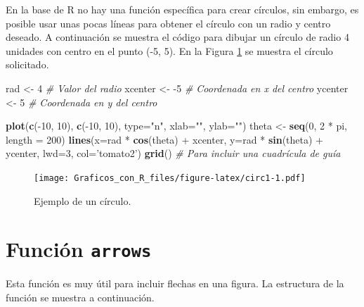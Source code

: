 \documentclass[10pt,]{krantz}
\makeatletter
\newenvironment{Shaded}{\begin{snugshade}}{\end{snugshade}}
\newcommand{\KeywordTok}[1]{\textcolor[rgb]{0.13,0.29,0.53}{\textbf{{#1}}}}
\newcommand{\DataTypeTok}[1]{\textcolor[rgb]{0.13,0.29,0.53}{{#1}}}
\newcommand{\DecValTok}[1]{\textcolor[rgb]{0.00,0.00,0.81}{{#1}}}
\newcommand{\StringTok}[1]{\textcolor[rgb]{0.31,0.60,0.02}{{#1}}}
\newcommand{\CommentTok}[1]{\textcolor[rgb]{0.56,0.35,0.01}{\textit{{#1}}}}
\newcommand{\NormalTok}[1]{{#1}}
\let\proglang=\textsf
\newenvironment{kframe}{%
\medskip{}
\setlength{\fboxsep}{.8em}
 \def\at@end@of@kframe{}%
 \ifinner\ifhmode%
  \def\at@end@of@kframe{\end{minipage}}%
  \begin{minipage}{\columnwidth}%
 \fi\fi%
 \def\FrameCommand##1{\hskip\@totalleftmargin \hskip-\fboxsep
 \colorbox{shadecolor}{##1}\hskip-\fboxsep
     \hskip-\linewidth \hskip-\@totalleftmargin \hskip\columnwidth}%
 \MakeFramed {\advance\hsize-\width
   \@totalleftmargin\z@ \linewidth\hsize
   \@setminipage}}%
 {\par\unskip\endMakeFramed%
 \at@end@of@kframe}
\renewenvironment{Shaded}{\begin{kframe}}{\end{kframe}}
\makeatother
\begin{document}
En la base de \proglang{R} no hay una función específica para crear
círculos, sin embargo, es posible usar unas pocas líneas para obtener el
círculo con un radio y centro deseado. A continuación se muestra el
código para dibujar un círculo de radio 4 unidades con centro en el
punto (-5, 5). En la Figura \ref{fig:circ1} se muestra el círculo
solicitado.

\begin{Shaded}
\begin{Highlighting}[]
\NormalTok{rad     <-}\StringTok{ }\DecValTok{4}   \CommentTok{# Valor del radio}
\NormalTok{xcenter <-}\StringTok{ }\NormalTok{-}\DecValTok{5}  \CommentTok{# Coordenada en x del centro}
\NormalTok{ycenter <-}\StringTok{ }\DecValTok{5}   \CommentTok{# Coordenada en y del centro}

\KeywordTok{plot}\NormalTok{(}\KeywordTok{c}\NormalTok{(-}\DecValTok{10}\NormalTok{, }\DecValTok{10}\NormalTok{), }\KeywordTok{c}\NormalTok{(-}\DecValTok{10}\NormalTok{, }\DecValTok{10}\NormalTok{), }\DataTypeTok{type=}\StringTok{"n"}\NormalTok{, }\DataTypeTok{xlab=}\StringTok{""}\NormalTok{, }\DataTypeTok{ylab=}\StringTok{""}\NormalTok{)}
\NormalTok{theta <-}\StringTok{ }\KeywordTok{seq}\NormalTok{(}\DecValTok{0}\NormalTok{, }\DecValTok{2} \NormalTok{*}\StringTok{ }\NormalTok{pi, }\DataTypeTok{length =} \DecValTok{200}\NormalTok{)}
\KeywordTok{lines}\NormalTok{(}\DataTypeTok{x=}\NormalTok{rad *}\StringTok{ }\KeywordTok{cos}\NormalTok{(theta) +}\StringTok{ }\NormalTok{xcenter, }\DataTypeTok{y=}\NormalTok{rad *}\StringTok{ }\KeywordTok{sin}\NormalTok{(theta) +}\StringTok{ }\NormalTok{ycenter,}
      \DataTypeTok{lwd=}\DecValTok{3}\NormalTok{, }\DataTypeTok{col=}\StringTok{'tomato2'}\NormalTok{)}
\KeywordTok{grid}\NormalTok{()  }\CommentTok{# Para incluir una cuadrícula de guía}
\end{Highlighting}
\end{Shaded}

\begin{figure}[htbp]
\centering
\texttt{[image: Graficos\_con\_R\_files/figure-latex/circ1-1.pdf]}
\caption{\label{fig:circ1}Ejemplo de un círculo.}
\end{figure}

\section{\texorpdfstring{Función \texttt{arrows} 
}{Función arrows  }}\label{funcion-arrows}

Esta función es muy útil para incluir flechas en una figura. La
estructura de la función se muestra a continuación.
\end{document}
